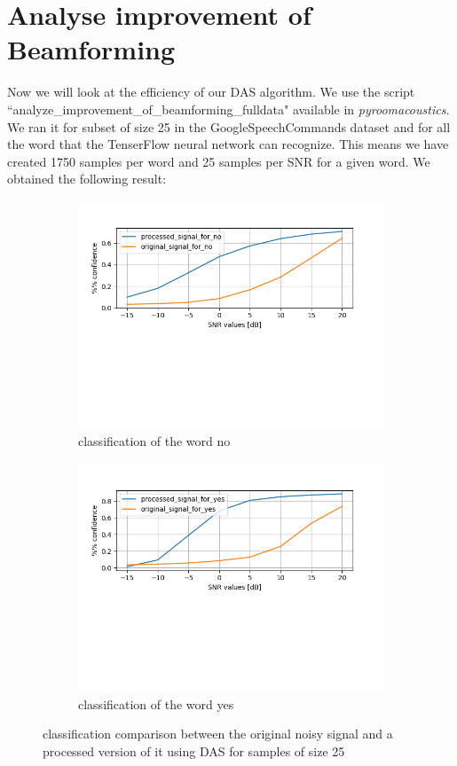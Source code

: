 \documentclass[11pt,a4paper,titlepage]{report}
\begin{document}
\section{Analyse improvement of Beamforming}
\hspace*{0.6cm}
Now we will look at the efficiency of our DAS algorithm. We use the script ``analyze\_improvement\_of\_beamforming\_fulldata" available in \textit{pyroomacoustics}. We ran it for subset of size 25 in the GoogleSpeechCommands dataset and for all the word that the TenserFlow neural network can recognize. This means we have created 1750 samples per word and 25 samples per SNR for a given word. We obtained the following result:\\
\begin{figure}[h!]
	\centering
	\begin{subfigure}{.5\textwidth}
		\centering
		\includegraphics[width=0.9\linewidth]{rapport_beamforming_no.png}
		\caption{classification of the word no}
		\label{fig:sub4}
	\end{subfigure}%
	\begin{subfigure}{.5\textwidth}
		\centering
		\includegraphics[width=0.9\linewidth]{rapport_beamforming_yes.png}
		\caption{classification of the word yes}
		\label{fig:sub6}
	\end{subfigure}
	
	\caption{classification comparison between the original noisy signal and a processed version of it using DAS for samples of size 25}
	\label{fig:rapport15}
\end{figure}\\
\end{document}
